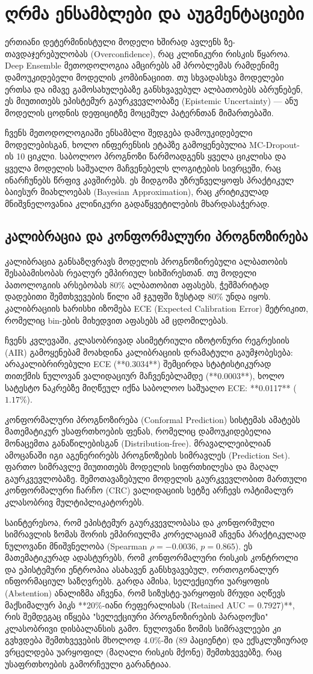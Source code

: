 \documentclass[12pt,a4paper,oneside]{report}
\begin{document}
\section{ღრმა ენსამბლები და აუგმენტაციები}
ერთიანი დეტერმინისტული მოდელი ხშირად ავლენს ზე-თავდაჯერებულობას (Overconfidence), რაც კლინიკური რისკის წყაროა. Deep Ensemble მეთოდოლოგია ამცირებს ამ პრობლემას რამდენიმე დამოუკიდებელი მოდელის კომბინაციით. თუ სხვადასხვა მოდელები ერთსა და იმავე გამოსახულებაზე განსხვავებულ ალბათობებს აბრუნებენ, ეს მიუთითებს ეპისტემურ გაურკვევლობაზე (Epistemic Uncertainty) — ანუ მოდელის ცოდნის დეფიციტზე მოცემულ პატერნთან მიმართებაში.

ჩვენს მეთოდოლოგიაში ენსამბლი შედგება დამოუკიდებელი მოდელებისგან, ხოლო ინფერენსის ეტაპზე გამოყენებულია MC-Dropout-ის 10 ციკლი. საბოლოო პროგნოზი წარმოადგენს ყველა ციკლისა და ყველა მოდელის საშუალო მაჩვენებელს ლოგიტების სივრცეში, რაც ინარჩუნებს წრფივ კავშირებს. ეს მიდგომა უზრუნველყოფს პრაქტიკულ ბაიესურ მიახლოებას (Bayesian Approximation), რაც კრიტიკულად მნიშვნელოვანია კლინიკური გადაწყვეტილების მხარდასაჭერად.


\subsection{კალიბრაცია და კონფორმალური პროგნოზირება}
კალიბრაცია განსაზღვრავს მოდელის პროგნოზირებული ალბათობის შესაბამისობას რეალურ ემპირიულ სიხშირესთან. თუ მოდელი პათოლოგიის არსებობას 80\% ალბათობით აფასებს, ჭეშმარიტად დადებითი შემთხვევების წილი ამ ჯგუფში ზუსტად 80\% უნდა იყოს. კალიბრაციის ხარისხი იზომება ECE (Expected Calibration Error) მეტრიკით, რომელიც bin-ების მიხედვით აფასებს ამ ცდომილებას. 

ჩვენს კვლევაში, კლასობრივად ასიმეტრიული იზოტონური რეგრესიის (AIR) გამოყენებამ მოახდინა კალიბრაციის დრამატული გაუმჯობესება: არაკალიბრირებული ECE (**0.3034**) შემცირდა სტატისტიკურად თითქმის ნულოვან ვალიდაციურ მაჩვენებლამდე (**0.0003**), ხოლო სატესტო ნაკრებზე მიღწეულ იქნა საბოლოო საშუალო ECE: **0.0117** ($1.17\%$).

კონფორმალური პროგნოზირება (Conformal Prediction) სისტემას ამატებს მათემატიკურ უსაფრთხოების ფენას, რომელიც დამოუკიდებელია მონაცემთა განაწილებისგან (Distribution-free). მრავალლეიბლიან ამოცანაში იგი აგენერირებს პროგნოზების სიმრავლეს (Prediction Set). ფართო სიმრავლე მიუთითებს მოდელის სიფრთხილესა და მაღალ გაურკვევლობაზე. შემოთავაზებული მოდელის გაურკვევლობით მართული კონფორმალური ჩარჩო (CRC) ვალიდაციის სეტზე არჩევს ოპტიმალურ კლასობრივ მულტიპლიკატორებს. 

საინტერესოა, რომ ეპისტემურ გაურკვევლობასა და კონფორმული სიმრავლის ზომას შორის ემპირიულმა კორელაციამ აჩვენა პრაქტიკულად ნულოვანი მნიშვნელობა (Spearman $\rho = -0.0036$, $p = 0.865$). ეს მათემატიკურად ადასტურებს, რომ კონფორმალური რისკის კონტროლი და ეპისტემური ენტროპია ასახავენ განსხვავებულ, ორთოგონალურ ინფორმაციულ საზღვრებს. გარდა ამისა, სელექციური უარყოფის (Abstention) ანალიზმა აჩვენა, რომ სიზუსტე-უარყოფის მრუდი აღწევს მაქსიმალურ პიკს **20\%-იანი რეფერალისას (Retained AUC = 0.7927)**, რის შემდეგაც იწყება "სელექციური პროგნოზირების პარადოქსი" კლასობრივი დისბალანსის გამო. ნულოვანი ზომის სიმრავლეები კი გვხვდება შემთხვევების მხოლოდ 4.0\%-ში (89 პაციენტი) და ექსკლუზიურად ვრცელდება უარყოფილ (მაღალი რისკის მქონე) შემთხვევებზე, რაც უსაფრთხოების გამორჩეული გარანტიაა.
\end{document}
